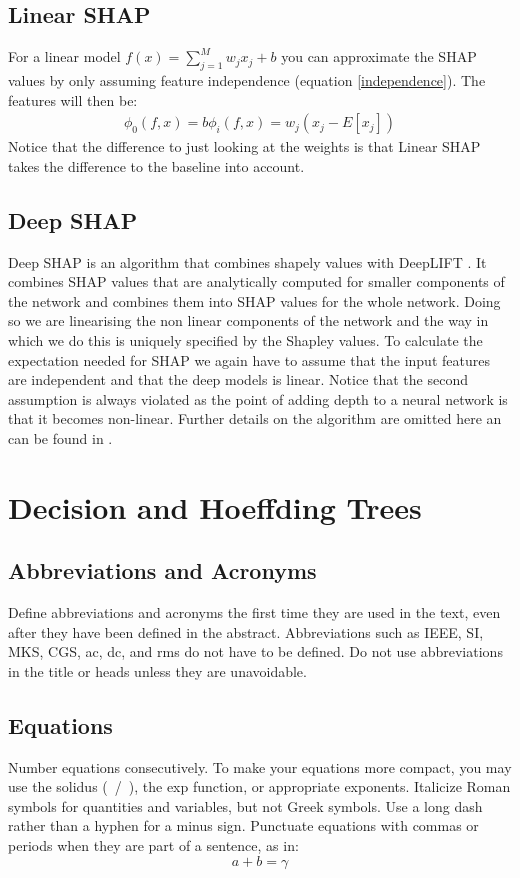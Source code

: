\documentclass[conference]{IEEEtran}
\begin{document}
\subsection{Linear SHAP}
For a linear model $f(x) = \sum_{j=1}^M w_j x_j + b$ you can approximate the SHAP values by only assuming feature independence (equation \ref{independence}).
The features will then be:
\begin{align}
\phi_0(f,x) = b
\phi_i(f,x) = w_j(x_j - E[x_j]) 
\end{align}
Notice that the difference to just looking at the weights is that Linear SHAP takes the difference to the baseline into account.

\subsection{Deep SHAP}
Deep SHAP \cite{b2} is an algorithm that combines shapely values with DeepLIFT \cite{b5}.
It combines SHAP values that are analytically computed for smaller components of the network and combines them into SHAP values for the whole network. Doing so we are linearising the non linear components of the network and the way in which we do this is uniquely specified by the Shapley values.
To calculate the expectation needed for SHAP we again have to assume that the input features are independent and that the deep models is linear. 
Notice that the second assumption is always violated as the point of adding depth to a neural network is that it becomes non-linear.
Further details on the algorithm are omitted here an can be found in \cite{b2}.


\section{Decision and Hoeffding Trees}

\subsection{Abbreviations and Acronyms}\label{AA}
Define abbreviations and acronyms the first time they are used in the text, 
even after they have been defined in the abstract. Abbreviations such as 
IEEE, SI, MKS, CGS, ac, dc, and rms do not have to be defined. Do not use 
abbreviations in the title or heads unless they are unavoidable.

\subsection{Equations}
Number equations consecutively. To make your 
equations more compact, you may use the solidus (~/~), the exp function, or 
appropriate exponents. Italicize Roman symbols for quantities and variables, 
but not Greek symbols. Use a long dash rather than a hyphen for a minus 
sign. Punctuate equations with commas or periods when they are part of a 
sentence, as in:
\begin{equation}
a+b=\gamma\label{eq}
\end{equation}
\end{document}
